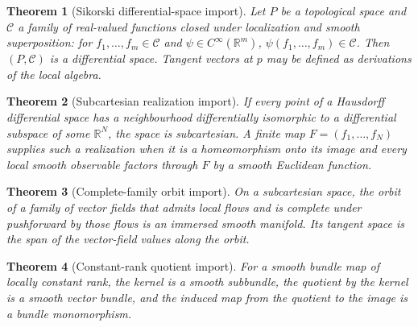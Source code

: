 \documentclass[11pt]{article}
\newtheorem{theorem}{Theorem}[section]
\theoremstyle{remark}
\begin{document}
\begin{theorem}[Sikorski differential-space import]\label{thm:ts-sikorski}
Let $P$ be a topological space and $\mathscr C$ a family of real-valued functions closed under localization and smooth superposition: for $f_1,\ldots,f_m\in\mathscr C$ and $\psi\in C^\infty(\mathbb R^m)$, $\psi(f_1,\ldots,f_m)\in\mathscr C$.  Then $(P,\mathscr C)$ is a differential space.  Tangent vectors at $p$ may be defined as derivations of the local algebra.
\end{theorem}

\begin{theorem}[Subcartesian realization import]\label{thm:ts-subcartesian}
If every point of a Hausdorff differential space has a neighbourhood differentially isomorphic to a differential subspace of some $\mathbb R^N$, the space is subcartesian.  A finite map $F=(f_1,\ldots,f_N)$ supplies such a realization when it is a homeomorphism onto its image and every local smooth observable factors through $F$ by a smooth Euclidean function.
\end{theorem}

\begin{theorem}[Complete-family orbit import]\label{thm:ts-orbit-import}
On a subcartesian space, the orbit of a family of vector fields that admits local flows and is complete under pushforward by those flows is an immersed smooth manifold.  Its tangent space is the span of the vector-field values along the orbit.
\end{theorem}

\begin{theorem}[Constant-rank quotient import]\label{thm:ts-constant-rank}
For a smooth bundle map of locally constant rank, the kernel is a smooth subbundle, the quotient by the kernel is a smooth vector bundle, and the induced map from the quotient to the image is a bundle monomorphism.
\end{theorem}
\end{document}
